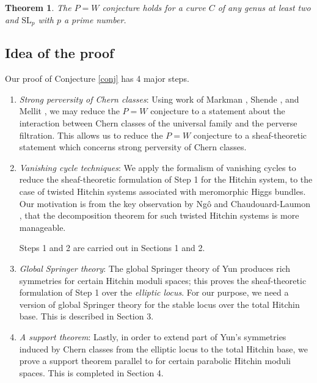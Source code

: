 \documentclass[11pt]{amsart}
\theoremstyle{plain}
\newtheorem{thm}{Theorem}[section]
\theoremstyle{definition}
\theoremstyle{remark}
\begin{document}
\begin{thm}
The $P=W$ conjecture holds for a curve $C$ of any genus at least two and $\mathrm{SL}_p$ with $p$ a prime number.
\end{thm}






\subsection{Idea of the proof}
Our proof of Conjecture \ref{conj} has 4 major steps.

\begin{enumerate}
    \item[Step 1.] \emph{Strong perversity of Chern classes}: Using work of Markman \cite{Markman}, Shende \cite{Shende}, and Mellit \cite{Mellit}, we may reduce the $P=W$ conjecture to a statement about the interaction between Chern classes of the universal family and the perverse filtration. This allows us to reduce the $P=W$ conjecture to a sheaf-theoretic statement which concerns strong perversity of Chern classes.
    \item[Step 2.] \emph{Vanishing cycle techniques}: We apply the formalism of vanishing cycles to reduce the sheaf-theoretic formulation of Step 1 for the Hitchin system, to the case of twisted Hitchin systems associated with meromorphic Higgs bundles. Our motivation is from the key observation by Ng\^o \cite{Ngo} and Chaudouard-Laumon \cite{CL}, that the decomposition theorem for such twisted Hitchin systems is more manageable. 
    
    Steps 1 and 2 are carried out in Sections 1 and 2.  

    \item[Step 3.]\emph{Global Springer theory}: The global Springer theory of Yun \cite{Yun1, Yun2,Yun3} produces rich symmetries for certain Hitchin moduli spaces; this proves the sheaf-theoretic formulation of Step 1 over the \emph{elliptic locus}. For our purpose, we need a version of global Springer theory for the stable locus over the total Hitchin base. This is described in Section 3.

    \item[Step 4.] \emph{A support theorem}: Lastly, in order to extend part of Yun's symmetries induced by Chern classes from the elliptic locus to the total Hitchin base, we prove a support theorem parallel to \cite{CL} for certain parabolic Hitchin moduli spaces. This is completed in Section 4.
\end{enumerate}
\end{document}
